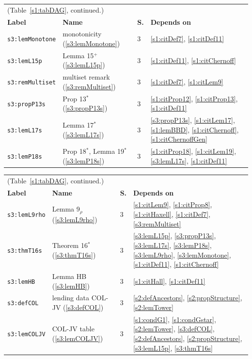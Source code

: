 \begin{center}
{\footnotesize
\setlength{\tabcolsep}{3pt}
\begin{tabular}{p{3.2cm}p{3.6cm}p{0.5cm}p{7.6cm}}
\multicolumn{4}{l}{(Table~\ref{s1:tabDAG}, continued.)}\\
\textbf{Label} & \textbf{Name} & \textbf{S.} & \textbf{Depends on}\\
\hline
\texttt{s3:lemMonotone} & monotonicity (\ref{s3:lemMonotone}) & 3 & \ref{s1:citDef7}, \ref{s1:citDef11}\\
\texttt{s3:lemL15p} & Lemma 15$^+$ (\ref{s3:lemL15p}) & 3 & \ref{s1:citDef11}, \ref{s1:citChernoff}\\
\texttt{s3:remMultiset} & multiset remark (\ref{s3:remMultiset}) & 3 & \ref{s1:citDef7}, \ref{s1:citLem9}\\
\texttt{s3:propP13s} & Prop 13$^*$ (\ref{s3:propP13s}) & 3 & \ref{s1:citProp12}, \ref{s1:citProp13}, \ref{s1:citDef11}\\
\texttt{s3:lemL17s} & Lemma 17$^*$ (\ref{s3:lemL17s}) & 3 & \ref{s3:propP13s}, \ref{s1:citLem17}, \ref{s1:lemBBD}, \ref{s1:citChernoff}, \ref{s1:citChernoffGen}\\
\texttt{s3:lemP18s} & Prop 18$^*$, Lemma 19$^*$ (\ref{s3:lemP18s}) & 3 & \ref{s1:citProp18}, \ref{s1:citLem19}, \ref{s3:lemL17s}, \ref{s1:citDef11}\\
\hline
\end{tabular}}
\end{center}

\begin{center}
{\footnotesize
\setlength{\tabcolsep}{3pt}
\begin{tabular}{p{3.2cm}p{3.6cm}p{0.5cm}p{7.6cm}}
\multicolumn{4}{l}{(Table~\ref{s1:tabDAG}, continued.)}\\
\textbf{Label} & \textbf{Name} & \textbf{S.} & \textbf{Depends on}\\
\hline
\texttt{s3:lemL9rho} & Lemma 9$_\rho$ (\ref{s3:lemL9rho}) & 3 & \ref{s1:citLem9}, \ref{s1:citProp8}, \ref{s1:citHaxell}, \ref{s1:citDef7}, \ref{s3:remMultiset}\\
\texttt{s3:thmT16s} & Theorem 16$^*$ (\ref{s3:thmT16s}) & 3 & \ref{s3:lemL15p}, \ref{s3:propP13s}, \ref{s3:lemL17s}, \ref{s3:lemP18s}, \ref{s3:lemL9rho}, \ref{s3:lemMonotone}, \ref{s1:citDef11}, \ref{s1:citChernoff}\\
\texttt{s3:lemHB} & Lemma HB (\ref{s3:lemHB}) & 3 & \ref{s1:citHall}, \ref{s1:citDef11}\\
\texttt{s3:defCOL} & lending data COL-JV (\ref{s3:defCOL}) & 3 & \ref{s2:defAncestors}, \ref{s2:propStructure}, \ref{s2:lemTower}\\
\texttt{s3:lemCOLJV} & COL-JV table (\ref{s3:lemCOLJV}) & 3 & \ref{s1:condG1}, \ref{s1:condGstar}, \ref{s2:lemTower}, \ref{s3:defCOL}, \ref{s2:defAncestors}, \ref{s2:propStructure}, \ref{s3:lemL15p}, \ref{s3:thmT16s}\\
\hline
\end{tabular}}
\end{center}

